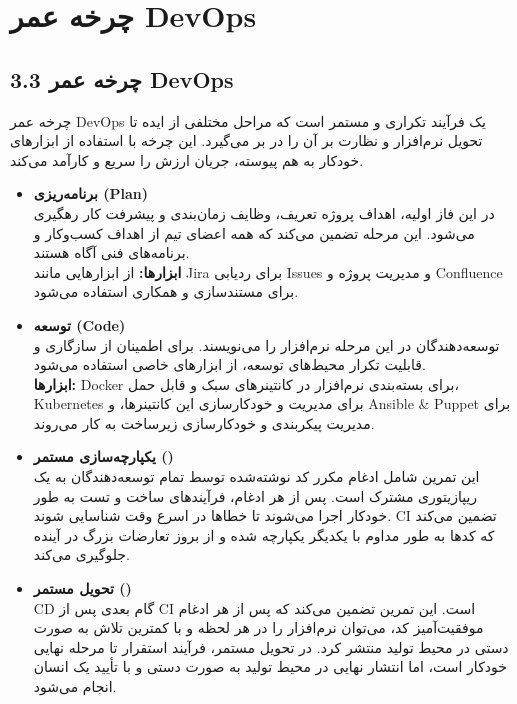 \section{چرخه عمر DevOps}
\subsection*{3.3 چرخه عمر DevOps}
چرخه عمر DevOps یک فرآیند تکراری و مستمر است که مراحل مختلفی از ایده تا تحویل نرم‌افزار و نظارت بر آن را در بر می‌گیرد. این چرخه با استفاده از ابزارهای خودکار به هم پیوسته، جریان ارزش را سریع و کارآمد می‌کند.

\begin{itemize}
    \item \textbf{برنامه‌ریزی (Plan)} \\
    در این فاز اولیه، اهداف پروژه تعریف، وظایف زمان‌بندی و پیشرفت کار رهگیری می‌شود. این مرحله تضمین می‌کند که همه اعضای تیم از اهداف کسب‌وکار و برنامه‌های فنی آگاه هستند. \\
    \textbf{ابزارها:} از ابزارهایی مانند Jira برای ردیابی Issues و مدیریت پروژه و Confluence برای مستندسازی و همکاری استفاده می‌شود.

    \item \textbf{توسعه (Code)} \\
    توسعه‌دهندگان در این مرحله نرم‌افزار را می‌نویسند. برای اطمینان از سازگاری و قابلیت تکرار محیط‌های توسعه، از ابزارهای خاصی استفاده می‌شود. \\
    \textbf{ابزارها:} Docker برای بسته‌بندی نرم‌افزار در کانتینرهای سبک و قابل حمل، Kubernetes برای مدیریت و خودکارسازی این کانتینرها، و Ansible \& Puppet برای مدیریت پیکربندی و خودکارسازی زیرساخت به کار می‌روند.

    \item \textbf{یکپارچه‌سازی مستمر ()} \\
    این تمرین شامل ادغام مکرر کد نوشته‌شده توسط تمام توسعه‌دهندگان به یک ریپازیتوری مشترک است. پس از هر ادغام، فرآیندهای ساخت و تست به طور خودکار اجرا می‌شوند تا خطاها در اسرع وقت شناسایی شوند. CI تضمین می‌کند که کدها به طور مداوم با یکدیگر یکپارچه شده و از بروز تعارضات بزرگ در آینده جلوگیری می‌کند.

    \item \textbf{تحویل مستمر ()} \\
    CD گام بعدی پس از CI است. این تمرین تضمین می‌کند که پس از هر ادغام موفقیت‌آمیز کد، می‌توان نرم‌افزار را در هر لحظه و با کمترین تلاش به صورت دستی در محیط تولید منتشر کرد. در تحویل مستمر، فرآیند استقرار تا مرحله نهایی خودکار است، اما انتشار نهایی در محیط تولید به صورت دستی و با تأیید یک انسان انجام می‌شود.


\end{itemize}
